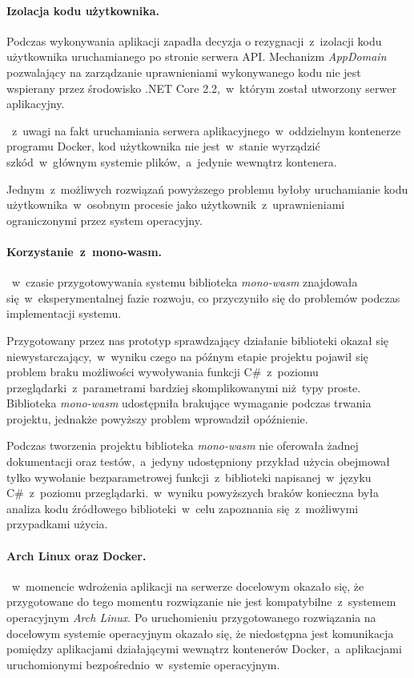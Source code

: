 \documentclass[a4paper,11pt,twoside]{report}
\theoremstyle{definition}
\begin{document}
        \paragraph{Izolacja kodu użytkownika.}
            \label{problemy-izolacja-kodu-uzytkownika}
            Podczas wykonywania aplikacji zapadła decyzja o rezygnacji~z~izolacji kodu użytkownika uruchamianego po stronie serwera API. Mechanizm \textit{AppDomain} pozwalający na zarządzanie uprawnieniami wykonywanego kodu nie jest wspierany przez środowisko .NET Core 2.2,~w~którym został utworzony serwer aplikacyjny. 
            
           ~z~uwagi na fakt uruchamiania serwera aplikacyjnego~w~oddzielnym kontenerze programu Docker, kod użytkownika nie jest~w~stanie wyrządzić szkód~w~głównym systemie plików,~a~jedynie wewnątrz kontenera.
            
            Jednym~z~możliwych rozwiązań powyższego problemu byłoby uruchamianie kodu użytkownika~w~osobnym procesie jako użytkownik~z~uprawnieniami ograniczonymi przez system operacyjny.
            
        \paragraph{Korzystanie~z~mono-wasm.}     
           ~w~czasie przygotowywania systemu biblioteka \textit{mono-wasm} znajdowała się~w~eksperymentalnej fazie rozwoju, co przyczyniło się do problemów podczas implementacji systemu.
            
            Przygotowany przez nas prototyp sprawdzający działanie biblioteki okazał się niewystarczający,~w~wyniku czego na późnym etapie projektu pojawił się problem braku możliwości wywoływania funkcji C\#~z~poziomu przeglądarki~z~parametrami bardziej skomplikowanymi niż typy proste. Biblioteka \textit{mono-wasm} udostępniła brakujące wymaganie podczas trwania projektu, jednakże powyższy problem wprowadził opóźnienie.
            
            Podczas tworzenia projektu biblioteka \textit{mono-wasm} nie oferowała żadnej dokumentacji oraz testów,~a~jedyny udostępniony przykład użycia obejmował tylko wywołanie bezparametrowej funkcji~z~biblioteki napisanej~w~języku C\#~z~poziomu przeglądarki.~w~wyniku powyższych braków konieczna była analiza kodu źródłowego biblioteki~w~celu zapoznania się~z~możliwymi przypadkami użycia.
        
        \paragraph{Arch Linux oraz Docker.}
           ~w~momencie wdrożenia aplikacji na serwerze docelowym okazało się, że przygotowane do tego momentu rozwiązanie nie jest kompatybilne~z~systemem operacyjnym \textit{Arch Linux}. Po uruchomieniu przygotowanego rozwiązania na docelowym systemie operacyjnym okazało się, że niedostępna jest komunikacja pomiędzy aplikacjami działającymi wewnątrz kontenerów Docker,~a~aplikacjami uruchomionymi bezpośrednio~w~systemie operacyjnym.
            
\end{document}
